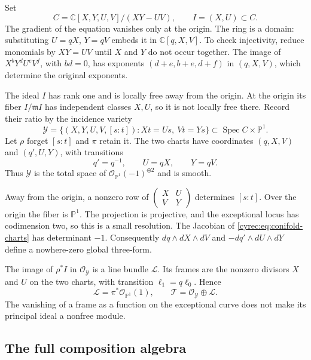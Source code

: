 Set
\begin{equation}\label{cyrec:eq:conifold}
 C=\mathbb C[X,Y,U,V]/(XY-UV),\qquad I=(X,U)\subset C.
\end{equation}
The gradient of the equation vanishes only at the origin.
The ring is a domain: substituting $U=qX$, $Y=qV$ embeds it in
$\mathbb C[q,X,V]$. To check injectivity, reduce monomials by
$XY=UV$ until $X$ and $Y$ do not occur together.
The image of $X^bY^dU^eV^f$, with $bd=0$, has exponents
$(d+e,b+e,d+f)$ in $(q,X,V)$, which determine the original
exponents.

The ideal $I$ has rank one and is locally free away from the
origin. At the origin its fiber $I/\mathfrak m I$ has independent
classes $X,U$, so it is not locally free there. Record their ratio
by the incidence variety
\begin{equation}\label{cyrec:eq:incidence}
 \mathcal Y=\{(X,Y,U,V,[s:t]):Xt=Us,\ Vt=Ys\}
                \subset\operatorname{Spec}C\times\mathbb P^1.
\end{equation}
Let $\rho$ forget $[s:t]$ and $\pi$ retain it.
The two charts have coordinates $(q,X,V)$ and $(q',U,Y)$,
with transitions
\begin{equation}\label{cyrec:eq:conifold-charts}
 q'=q^{-1},\qquad U=qX,\qquad Y=qV.
\end{equation}
Thus $\mathcal Y$ is the total space of
$\mathcal O_{\mathbb P^1}(-1)^{\oplus2}$ and is smooth.

Away from the origin, a nonzero row of
$\left(\begin{smallmatrix}X&U\\V&Y\end{smallmatrix}\right)$
determines $[s:t]$. Over the origin the fiber is $\mathbb P^1$.
The projection is projective, and the exceptional locus has
codimension two, so this is a small resolution.
The Jacobian of \eqref{cyrec:eq:conifold-charts} has determinant
$-1$. Consequently $dq\wedge dX\wedge dV$ and
$-dq'\wedge dU\wedge dY$ define a nowhere-zero global
three-form.

The image of $\rho^*I$ in $\mathcal O_{\mathcal Y}$ is a line
bundle $\mathcal L$. Its frames are the nonzero divisors $X$
and $U$ on the two charts, with transition $\ell_1=q\ell_0$.
Hence
\[
 \mathcal L=\pi^*\mathcal O_{\mathbb P^1}(1),
 \qquad\mathcal T=\mathcal O_{\mathcal Y}\oplus\mathcal L.
\]
The vanishing of a frame as a function on the exceptional curve
does not make its principal ideal a nonfree module.

\subsection{The full composition algebra}

